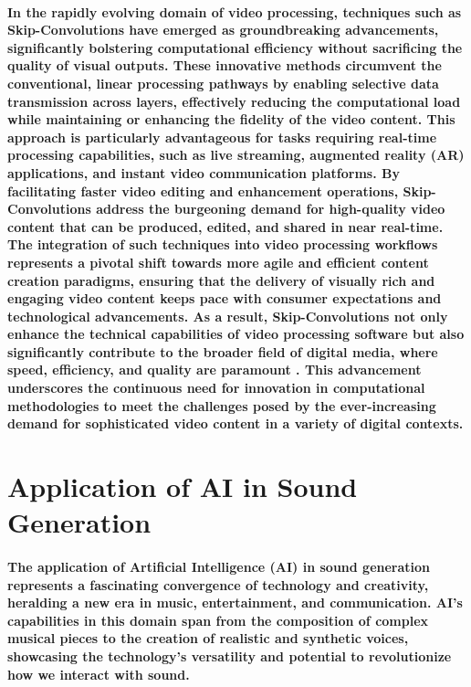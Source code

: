 \documentclass[11pt,a4paper,oneside]{report}
\begin{document}
\paragraph{In the rapidly evolving domain of video processing, techniques such as Skip-Convolutions have emerged as groundbreaking advancements, significantly bolstering computational efficiency without sacrificing the quality of visual outputs. These innovative methods circumvent the conventional, linear processing pathways by enabling selective data transmission across layers, effectively reducing the computational load while maintaining or enhancing the fidelity of the video content. This approach is particularly advantageous for tasks requiring real-time processing capabilities, such as live streaming, augmented reality (AR) applications, and instant video communication platforms. By facilitating faster video editing and enhancement operations, Skip-Convolutions address the burgeoning demand for high-quality video content that can be produced, edited, and shared in near real-time. The integration of such techniques into video processing workflows represents a pivotal shift towards more agile and efficient content creation paradigms, ensuring that the delivery of visually rich and engaging video content keeps pace with consumer expectations and technological advancements. As a result, Skip-Convolutions not only enhance the technical capabilities of video processing software but also significantly contribute to the broader field of digital media, where speed, efficiency, and quality are paramount \cite{habibian2021skip}. This advancement underscores the continuous need for innovation in computational methodologies to meet the challenges posed by the ever-increasing demand for sophisticated video content in a variety of digital contexts.}

\section{Application of AI in Sound Generation}
\paragraph{The application of Artificial Intelligence (AI) in sound generation represents a fascinating convergence of technology and creativity, heralding a new era in music, entertainment, and communication. AI's capabilities in this domain span from the composition of complex musical pieces to the creation of realistic and synthetic voices, showcasing the technology's versatility and potential to revolutionize how we interact with sound.}
\end{document}
